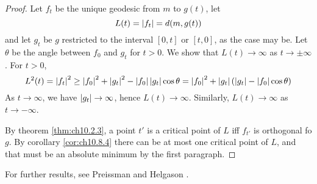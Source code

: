 \documentclass[../main]{subfiles}
\begin{document}
\begin{proof}
Let $f_t$ be the unique geodesic from $m$ to $g(t)$, let
\[L(t)=\left|f_t\right|=d(m,g(t))\]
and let $g_t$ be $g$ restricted to the interval $[0,t]$ or $[t,0]$, as the case may be. Let $\theta$ be the angle between $f_0$ and $g_t$ for $t>0$. We show that $L(t)\to\infty$ as $t\to\pm\infty$. For $t>0$,
\[L^2(t) = \left|f_t\right|^2 \ge \left|f_0\right|^2 + \left|g_t\right|^2 - \left|f_0\right|\left|g_t\right|\cos\theta
= \left|f_0\right|^2 + \left|g_t\right|(\left|g_t\right|-\left|f_0\right|\cos\theta)\]
As $t\to\infty$, we have $\left|g_t\right|\to\infty$, hence $L(t)\to\infty$. Similarly, $L(t)\to\infty$ as $t\to-\infty$.

By theorem \ref{thm:ch10.2.3}, a point $t'$ is a critical point of $L$ iff $f_{t'}$ is orthogonal fo $g$. By corollary \ref{cor:ch10.8.4} there can be at most one critical point of $L$, and that must be an absolute minimum by the first paragraph.
\end{proof}

For further results, see Preissman \cite{Preissmann1943quelques} and Helgason \cite{helgason2012differential}.
\end{document}
